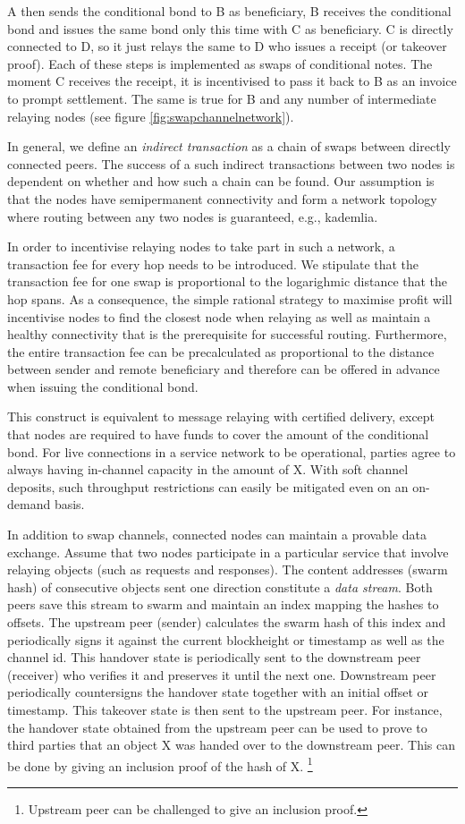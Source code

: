 \documentclass[a4paper,10pt]{article}
\begin{document}
A then sends the conditional bond to B as beneficiary, B receives the conditional bond
and issues the same bond
only this time with C as beneficiary. C is directly connected to D, so
it just relays the same to D who issues a receipt (or takeover proof).
Each of these steps is implemented as swaps of conditional notes. The moment C receives
the receipt, it is incentivised to pass it back to B as an invoice to prompt
settlement. The same is true for B and any number of intermediate relaying nodes
(see figure \ref{fig:swapchannelnetwork}).

In general, we define an \emph{indirect transaction} as a chain of swaps between directly connected
peers. The success of a such indirect transactions between two nodes is dependent on whether and
how such a chain can be found. Our assumption is that the nodes have semipermanent connectivity
and form a network topology where routing between any two nodes is guaranteed, e.g., kademlia.

In order to incentivise relaying nodes to take part in such a network,
a transaction fee for every hop needs to be introduced.  We stipulate that the transaction fee
for one swap is proportional to the logarighmic distance that the hop spans.
As a consequence, the simple rational strategy to maximise profit will incentivise nodes to find the
closest node when relaying as well as maintain a healthy connectivity that is the
prerequisite for successful routing.
Furthermore, the entire transaction fee can be precalculated as proportional
to the distance between sender and remote beneficiary and therefore can be offered in advance
when issuing the conditional bond.

This construct is
equivalent to message relaying with \gls{certified delivery}, except that nodes are required to have
funds to cover the amount of the conditional bond.
For live connections in a service network to be operational,
parties agree to always having in-channel capacity in the amount of X.
With soft channel deposits, such throughput restrictions can easily
be mitigated even on an on-demand basis.

In addition to swap channels, connected nodes can maintain a \gls{provable data exchange}.
Assume that two nodes participate in a particular service that involve
relaying objects (such as requests and responses).
The content addresses (swarm hash) of consecutive objects
sent one direction constitute a \emph{data stream}.
Both peers save this stream to swarm and maintain an index mapping the hashes to offsets.
The upstream peer (sender) calculates the swarm hash of this index and periodically
signs it against the current blockheight or timestamp as well as the channel id.
This \gls{handover state} is periodically sent to the downstream peer (receiver)
who verifies it and preserves it until the next one.
Downstream peer periodically countersigns the handover state together with an initial
offset or timestamp. This \gls{takeover state} is then sent to the upstream peer.
For instance, the handover state obtained from the upstream peer can be used to prove to third parties
that an object X was handed over to the downstream peer. This can be done by
giving an inclusion proof of the hash of X.%
%
\footnote{Upstream peer can be challenged to give an inclusion proof.}
\end{document}

